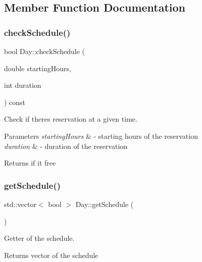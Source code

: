 \subsection{Member Function Documentation}
\mbox{\label{class_day_ae8354b4a88cd98f5513ea6bc5dfb017e}} 
\subsubsection{\texorpdfstring{check\+Schedule()}{checkSchedule()}}
{\footnotesize\ttfamily bool Day\+::check\+Schedule (\begin{DoxyParamCaption}\item[{double}]{starting\+Hours,  }\item[{int}]{duration }\end{DoxyParamCaption}) const}



Check if there\textquotesingle{}s reservation at a given time. 


\begin{DoxyParams}{Parameters}
{\em starting\+Hours} & -\/ starting hours of the reservation \\
\hline
{\em duration} & -\/ duration of the reservation \\
\hline
\end{DoxyParams}
\begin{DoxyReturn}{Returns}
if it free 
\end{DoxyReturn}
\mbox{\label{class_day_a89096a2d290b712108feb7fe3bf7da51}} 
\subsubsection{\texorpdfstring{get\+Schedule()}{getSchedule()}}
{\footnotesize\ttfamily std\+::vector$<$ bool $>$ Day\+::get\+Schedule (\begin{DoxyParamCaption}{ }\end{DoxyParamCaption})}



Getter of the schedule. 

\begin{DoxyReturn}{Returns}
vector of the schedule 
\end{DoxyReturn}
\mbox{\label{class_day_ab730d15c19486aa3c45839e8f5990c57}} 
